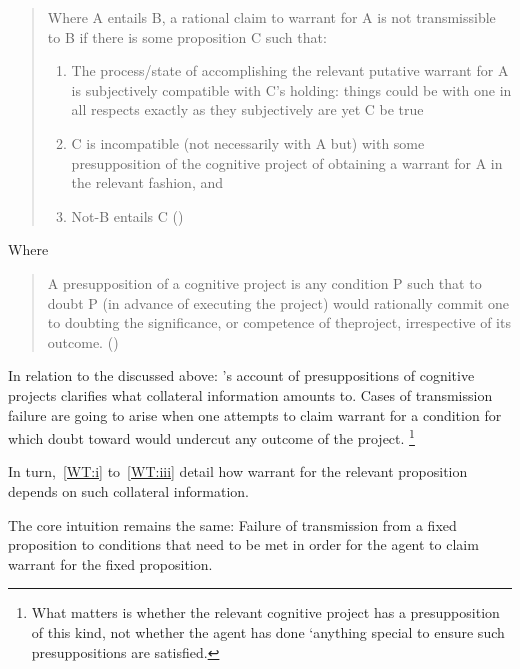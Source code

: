 \begin{note}
  \begin{quote}
    Where A entails B, a rational claim to warrant for A is not transmissible to B if there is some proposition C such that:
    \begin{enumerate}[label=\roman*., ref=(\roman*)]
    \item\label{WT:i} The process/state of accomplishing the relevant putative warrant for A is subjectively compatible with C's holding: things could be with one in all respects exactly as they subjectively are yet C be true
    \item\label{WT:ii} C is incompatible (not necessarily with A but) with some presupposition of the cognitive project of obtaining a warrant for A in the relevant fashion, and
    \item\label{WT:iii} Not-B entails C\nolinebreak
      \mbox{}\hfill\mbox{(\Citeyear[93]{Wright:2011wn})}
    \end{enumerate}
  \end{quote}
  Where
  \begin{quote}
    A presupposition of a cognitive project is any condition P such that to doubt P (in advance of executing the project) would rationally commit one to doubting the significance, or competence of the\linebreak project, irrespective of its outcome.\nolinebreak
    \mbox{}\hfill\mbox{(\Citeyear[92]{Wright:2011wn})}
  \end{quote}

  In relation to the \widt{} discussed above:
  \citeauthor{Wright:2011wn}'s account of presuppositions of cognitive projects clarifies what collateral information amounts to.
  Cases of transmission failure are going to arise when one attempts to claim warrant for a condition for which doubt toward would undercut any outcome of the project.\nolinebreak
  \footnote{
    What matters is whether the relevant cognitive project has a presupposition of this kind, not whether the agent has done `anything special to ensure such presuppositions are satisfied.
    }

  In turn,~\ref{WT:i} to~\ref{WT:iii} detail how warrant for the relevant proposition depends on such collateral information.
\end{note}

\begin{note}
  The core intuition remains the same:
  Failure of transmission from a fixed proposition to conditions that need to be met in order for the agent to claim warrant for the fixed proposition.
\end{note}

